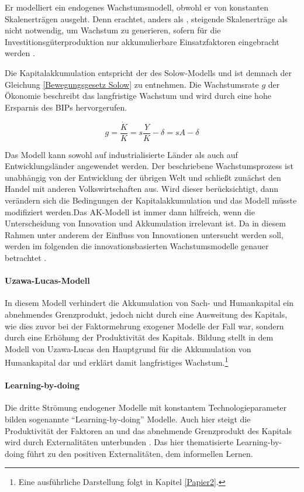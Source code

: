 Er modelliert ein endogenes Wachstumsmodell, obwohl er von konstanten Skalenertr{\"a}gen ausgeht. Denn \citet{Rebelo.1991} erachtet, anders als \citet{Romer.1990}, steigende Skalenertr{\"a}ge als nicht notwendig, um Wachstum zu generieren, sofern f{\"u}r die Investitionsg{\"u}terproduktion nur akkumulierbare Einsatzfaktoren eingebracht werden \citep{Rebelo.1991}. \newline


Die Kapitalakkumulation entspricht der des Solow-Modells und ist demnach der Gleichung \eqref{Bewegungsgesetz Solow} zu entnehmen. Die Wachstumsrate $g$ der {\"O}konomie beschreibt das langfristige Wachstum und wird durch eine hohe Ersparnis des BIPs hervorgerufen.

	\begin{equation}
		g=\frac{\dot{K}}{K}=s\frac{Y}{K}-\delta=sA-\delta
	\end{equation}

Das Modell kann sowohl auf industrialisierte L{\"a}nder als auch auf Entwicklungsl{\"a}nder angewendet werden. Der beschriebene  Wachstumsprozess ist unabh{\"a}ngig von der Entwicklung der {\"u}brigen Welt und schlie{\ss}t zun{\"a}chst den Handel mit anderen Volkswirtschaften aus. Wird dieser ber{\"u}cksichtigt, dann ver{\"a}ndern sich die Bedingungen der Kapitalakkumulation und das Modell m{\"u}sste modifiziert werden.\newline Das AK-Modell ist immer dann hilfreich, wenn die Unterscheidung von Innovation und Akkumulation irrelevant ist. Da in diesem Rahmen unter anderem der Einfluss von Innovationen untersucht werden soll, werden im folgenden die innovationsbasierten Wachstumsmodelle genauer betrachtet \citep{Aghion.2015}.


\paragraph{Uzawa-Lucas-Modell} In diesem Modell verhindert die Akkumulation von Sach- und Humankapital ein abnehmendes Grenzprodukt, jedoch nicht durch eine Ausweitung des Kapitals, wie dies zuvor bei der Faktormehrung exogener Modelle der Fall war, sondern durch eine Erhöhung der Produktivität des Kapitals. Bildung stellt in dem Modell von Uzawa-Lucas den Hauptgrund für die Akkumulation von Humankapital dar und erklärt damit langfristiges Wachstum.\footnote{Eine ausführliche Darstellung folgt in Kapitel \ref{Papier2}.}


\paragraph{Learning-by-doing}
Die dritte Strömung endogener Modelle mit konstantem Technologieparameter bilden sogenannte "`Learning-by-doing"' Modelle. Auch hier steigt die Produktivität der Faktoren an und das abnehmende Grenzprodukt des Kapitals wird durch Externalitäten unterbunden \cite{Arrow.1962}. Das hier thematisierte Learning-by-doing führt zu den positiven Externalitäten, dem informellen Lernen.


